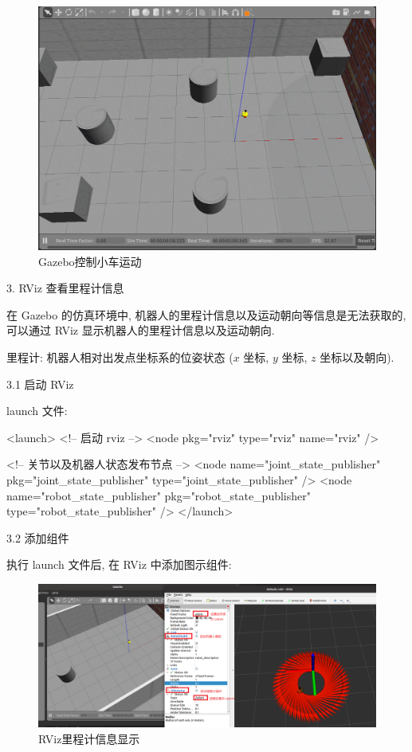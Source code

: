 \documentclass[openany, fontset=windowsold]{ctexbook}
\theoremstyle{kaiti}
\theoremstyle{normal}
\begin{document}
\begin{figure}[!ht]
  \centering
  \includegraphics[width=.9\textwidth]{ros_sim_control_robot_global.png}
  \caption{Gazebo控制小车运动}
  \label{fig:ros_sim_control_robot_global_copy}
\end{figure}

3. RViz 查看里程计信息

在 Gazebo 的仿真环境中, 机器人的里程计信息以及运动朝向等信息是无法获取的, 可以通过 RViz 显示机器人的里程计信息以及运动朝向.

里程计: 机器人相对出发点坐标系的位姿状态 ($x$ 坐标, $y$ 坐标, $z$ 坐标以及朝向).

3.1 启动 RViz

launch 文件:

\begin{xml}
  <launch>
      <!-- 启动 rviz -->
      <node pkg="rviz" type="rviz" name="rviz" />

      <!-- 关节以及机器人状态发布节点 -->
      <node name="joint_state_publisher" pkg="joint_state_publisher" type="joint_state_publisher" />
      <node name="robot_state_publisher" pkg="robot_state_publisher" type="robot_state_publisher" />
  </launch>
\end{xml}

3.2 添加组件

执行 launch 文件后, 在 RViz 中添加图示组件:

\begin{figure}[!ht]
  \centering
  \includegraphics[width=.9\textwidth]{rviz_show_odometry_data.png}
  \caption{RViz里程计信息显示}
  \label{fig:rviz_show_odometry_data}
\end{figure}
\end{document}
